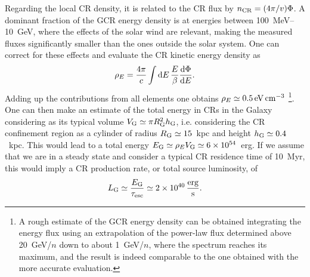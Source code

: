 \documentclass[twoside,12pt]{article}
\newcommand{\be}{\begin{equation}}
\newcommand{\ee}{\end{equation}}
\begin{document}
Regarding the local CR density, it is related to the CR flux by $n_{\rm CR}=(4\pi/v)\Phi$. A dominant fraction of the GCR energy density is at energies between 100~MeV--10~GeV, where the effects of the solar wind are relevant, making the measured fluxes significantly smaller than the ones outside the solar system. One can correct for these effects and evaluate the CR kinetic  energy density as 
\be
\rho_E=\frac{4\pi}{c}\int {\rm d}E\, \frac{E}{\beta}\frac{{\rm d}\Phi}{{\rm d}E}.
\ee
Adding up the contributions from all elements one obtains $\rho_E\simeq 0.5\,{\rm eV}\,{\rm cm^{-3}}$ \cite{gaisser}\footnote{A rough estimate of the GCR energy density can be obtained integrating the energy flux using an  extrapolation of the power-law flux determined above 20~GeV/$n$ down to about 1~GeV/$n$, where the spectrum reaches its maximum, and the result is indeed comparable to the one obtained with the more accurate evaluation.}.
One can then make an estimate of the total energy in CRs in the Galaxy considering as its typical volume  $V_{\rm G}\simeq \pi R_{\rm G}^2 h_{\rm G}$, i.e. considering the CR confinement region as a cylinder of radius $R_{\rm G}\simeq 15$~kpc and height $h_{\rm G}\simeq 0.4$~kpc. This would lead to a total energy $E_{\rm G}\simeq \rho_E V_{\rm G}\simeq 6\times 10^{54}$~erg. If we assume that we are in a steady state and consider a typical CR residence time of 10~Myr, this would imply a CR production rate, or total source luminosity, of
\be
L_{\rm G}\simeq \frac{E_{\rm G}}{\tau_{\rm esc}}\simeq  2\times 10^{40}\,\frac{\rm erg}{\rm s}.
\ee
\end{document}

